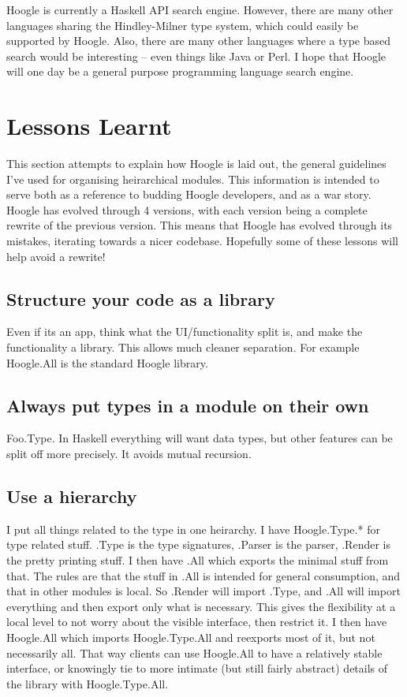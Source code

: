\documentclass{tmr}
\begin{document}
Hoogle is currently a Haskell API search engine. However, there are many other languages sharing the Hindley-Milner type system, which could easily be supported by Hoogle. Also, there are many other languages where a type based search would be interesting -- even things like Java or Perl. I hope that Hoogle will one day be a general purpose programming language search engine.

\section{Lessons Learnt}

This section attempts to explain how Hoogle is laid out, the general guidelines I've used for organising heirarchical modules. This information is intended to serve both as a reference to budding Hoogle developers, and as a war story. Hoogle has evolved through 4 versions, with each version being a complete rewrite of the previous version. This means that Hoogle has evolved through its mistakes, iterating towards a nicer codebase. Hopefully some of these lessons will help avoid a rewrite!

\subsection{Structure your code as a library}

Even if its an app, think what the UI/functionality split is, and make the functionality a library. This allows much cleaner separation. For example Hoogle.All is the standard Hoogle library.

\subsection{Always put types in a module on their own}

Foo.Type. In Haskell everything will want data types, but other features can be split off more precisely. It avoids mutual recursion.

\subsection{Use a hierarchy}

I put all things related to the type in one heirarchy. I have Hoogle.Type.* for type related stuff. .Type is the type signatures, .Parser is the parser, .Render is the pretty printing stuff. I then have .All which exports the minimal stuff from that. The rules are that the stuff in .All is intended for general consumption, and that in other modules is local. So .Render will import .Type, and .All will import everything and then export only what is necessary. This gives the flexibility at a local level to not worry about the visible interface, then restrict it. I then have Hoogle.All which imports Hoogle.Type.All and reexports most of it, but not necessarily all. That way clients can use Hoogle.All to have a relatively stable interface, or knowingly tie to more intimate (but still fairly abstract) details of the library with Hoogle.Type.All.
\end{document}
